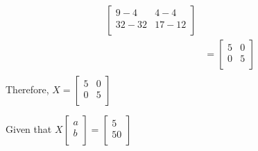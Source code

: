\documentclass{article}
\begin{document}
\begin{align}
\begin{bmatrix}
    9 - 4 & 4 - 4\\
    32 - 32 & 17 - 12\\
    \end{bmatrix}\nonumber\\
    & = \begin{bmatrix}
    5 & 0\\
    0 & 5\\
    \end{bmatrix}\nonumber\\
    \end{align} Therefore, $X = \begin{bmatrix}
    5 & 0\\
    0 & 5\\
    \end{bmatrix}$
    
 Given that $X\begin{bmatrix}
    a\\
    b\\
    \end{bmatrix}=\begin{bmatrix}
    5\\
    50\\
    \end{bmatrix}$
\end{document}

